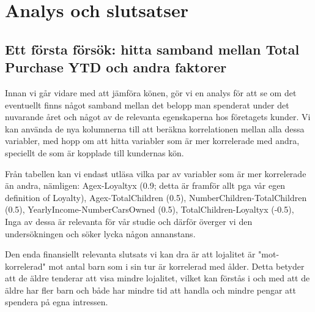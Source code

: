 \documentclass[]{article}
\begin{document}
\section{Analys och slutsatser}

\subsection{Ett första försök: hitta samband mellan Total Purchase YTD och andra faktorer}

Innan vi går vidare med att jämföra könen, gör vi en analys för att se om det eventuellt finns något samband mellan det belopp man spenderat under det nuvarande året och något av de relevanta egenskaperna hos företagets kunder. Vi kan använda de nya kolumnerna till att beräkna korrelationen mellan alla dessa variabler, med hopp om att hitta variabler som är mer korrelerade med andra, speciellt de som är kopplade till kundernas kön.

Från tabellen kan vi endast utläsa vilka par av variabler som är mer korrelerade än andra, nämligen: Agex-Loyaltyx (0.9; detta är framför allt pga vår egen definition of Loyalty), Agex-TotalChildren (0.5), NumberChildren-TotalChildren (0.5), YearlyIncome-NumberCarsOwned (0.5), TotalChildren-Loyaltyx (-0.5), Inga av dessa är relevanta för vår studie och därför överger vi den undersökningen och söker lycka någon annanstans.

Den enda finansiellt relevanta slutsats vi kan dra är att lojalitet är "mot-korrelerad" mot antal barn som i sin tur är korrelerad med ålder. Detta betyder att de äldre tenderar att visa mindre lojalitet, vilket kan förstås i och med att de äldre har fler barn och både har mindre tid att handla och mindre pengar att spendera på egna intressen.
\end{document}
